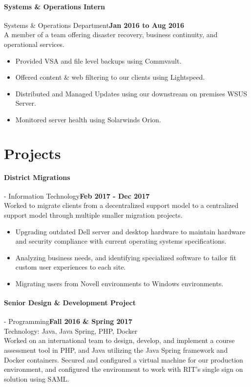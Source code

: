 \documentclass[10pt]{article}
\begin{document}
\paragraph{\bf Systems \& Operations Intern}{Systems \& Operations Department}\hfill{\bf Jan 2016 to Aug 2016}\\
A member of a team offering disaster recovery, business continuity, and operational services.
\begin{itemize}
  \setlength\itemsep{-0.25em}
  \item Provided VSA and file level backups using Commvault.
  \item Offered content \& web filtering to our clients using Lightspeed.
  \item Distributed and Managed Updates using our downstream on premises WSUS Server.
  \item Monitored server health using Solarwinds Orion.
\end{itemize}
\section*{\large Projects}
\paragraph{\bf District Migrations} - Information Technology\hfill{\bf Feb 2017 - Dec 2017}\\
Worked to migrate clients from a decentralized support model to a centralized support model through multiple smaller migration projects.
\begin{itemize}
  \setlength\itemsep{-0.25em}
  \item Upgrading outdated Dell server and desktop hardware to maintain hardware and security compliance with current operating systems specifications.
  \item Analyzing business needs, and identifying specialized software to tailor fit custom user experiences to each site.
  \item Migrating users from Novell environments to Windows environments.
\end{itemize}
\paragraph{\bf Senior Design \& Development Project} - Programming\hfill{\bf Fall 2016 \& Spring 2017}\\
Technology: Java, Java Spring, PHP, Docker\\
Worked on an international team to design, develop, and implement a course assessment tool in PHP, and Java utilizing the Java Spring framework and Docker containers. Secured and configured a virtual machine for our production environment, and configured the environment to work with RIT's single sign on solution using SAML.
\end{document}
